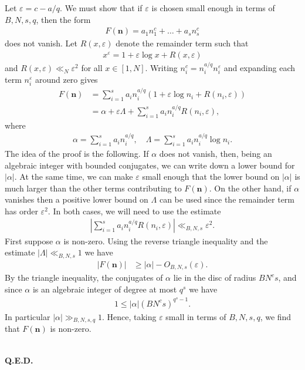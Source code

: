 \documentclass[9pt]{amsart}
\theoremstyle{my_theorem_style}
\numberwithin{definition}{section}
\renewenvironment{proof}{\noindent {\textbf{Proof.}}}{\\\textbf{Q.E.D.}}
\newcommand{\abs}[1]{\left|#1\right|}
\newcommand{\eps}{\varepsilon}
\renewcommand{\vec}[1]{\bm{#1}}
\begin{document}
\begin{proof}
    Let $\eps = c - a/q$. We must show that if $\eps$ is chosen small enough in terms of $B, N, s, q$, then the form
    \begin{align*}
        F(\vec{n}) = a_1 n_1^c + \dots + a_s n_s^c
    \end{align*}
    does not vanish. Let $R(x, \eps)$ denote the remainder term such that
    \begin{align*}
        x^\eps = 1 + \eps\log{x} + R(x, \eps)
    \end{align*}
    and $R(x, \eps) \ll_N \eps^2$ for all $x \in [1, N]$. Writing $n_i^c = n_i^{a/q}n_i^\eps$ and expanding each term $n_i^\eps$ around zero gives
    \begin{align*}
        F(\vec{n}) &= \sum_{i = 1}^s a_in_i^{a/q} (1 + \eps \log{n_i} + R(n_i, \eps)) \\
        &=
        \alpha + \eps \Lambda + \sum_{i = 1}^s a_in_i^{a/q}R(n_i, \eps),
    \end{align*}
    where
    \begin{align*}
        \alpha = \sum_{i = 1}^s a_in_i^{a/q}, \quad
        \Lambda = \sum_{i = 1}^s a_in_i^{a/q}\log{n_i}.
    \end{align*}
    The idea of the proof is the following. If $\alpha$ does not vanish, then, being an algebraic integer with bounded conjugates, we can write down a lower bound for $\abs{\alpha}$. At the same time, we can make $\eps$ small enough that the lower bound on $\abs{\alpha}$ is much larger than the other terms contributing to $F(\vec{n})$. On the other hand, if $\alpha$ vanishes then a positive lower bound on $\Lambda$ can be used since the remainder term has order $\eps^2$. In both cases, we will need to use the estimate
    \begin{align*}
        \abs{\sum_{i = 1}^s a_i n_i^{a/q} R(n_i, \eps)} \ll_{B, N, s} \eps^2.
    \end{align*}
    First suppose $\alpha$ is non-zero. Using the reverse triangle inequality and the estimate $|\Lambda| \ll_{B, N, s} 1$ we have
    \begin{align*}
        \abs{F(\vec{n})} &\geq
        \abs{\alpha} - O_{B, N, s}(\eps).
    \end{align*}
    By the triangle inequality, the conjugates of $\alpha$ lie in the disc of radius $BN^cs$, and since $\alpha$ is an algebraic integer of degree at most $q^s$ we have
    \begin{align*}
        1 \leq \abs{\alpha}(BN^c s)^{q^s - 1}.
    \end{align*}
    In particular $|\alpha| \gg_{B, N, s, q} 1$. Hence, taking $\eps$ small in terms of $B, N, s, q$, we find that $F(\vec{n})$ is non-zero.


\end{proof}
\end{document}
